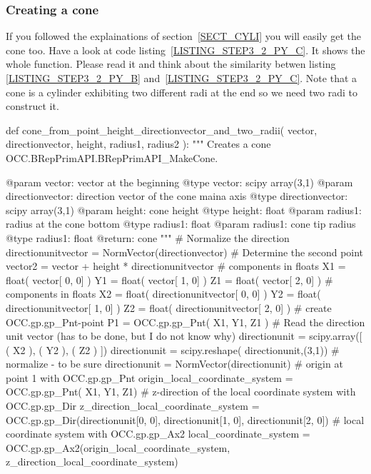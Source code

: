 \subsubsection{Creating a cone}
\label{SECT_CONE}
If you followed the explainations of section~\ref{SECT_CYLI} you will easily get the cone too.
Have a look at code listing~\ref{LISTING_STEP3_2_PY_C}.
It shows the whole function.
Please read it and think about the similarity betwen listing \ref{LISTING_STEP3_2_PY_B} and~\ref{LISTING_STEP3_2_PY_C}.
Note that a cone is a cylinder exhibiting two different radi at the end so we need two radi to construct it.
\begin{python}[moreemph={[4], 46, 48},caption={Step3\_2.py - Function defining a cone from a point, a direction vector, the height and two radi},label=LISTING_STEP3_2_PY_C]
def cone_from_point_height_directionvector_and_two_radii( vector, 
                                                          directionvector,
                                                          height,
                                                          radius1,
                                                          radius2 ):
    """
    Creates a cone OCC.BRepPrimAPI.BRepPrimAPI_MakeCone.
        
    @param vector: vector at the beginning
    @type  vector: scipy array(3,1)
    @param directionvector: direction vector of the cone maina axis 
    @type  directionvector: scipy array(3,1)
    @param height: cone height
    @type  height: float
    @param radius1: radius at the cone bottom
    @type  radius1: float
    @param radius1: cone tip radius
    @type  radius1: float
    @return: cone 
    """
    # Normalize the direction
    directionunitvector = NormVector(directionvector)
    # Determine the second point
    vector2 = vector + height * directionunitvector    
    # components in floats
    X1 = float( vector[ 0, 0] )
    Y1 = float( vector[ 1, 0] )
    Z1 = float( vector[ 2, 0] )
    # components in floats
    X2 = float( directionunitvector[ 0, 0] )
    Y2 = float( directionunitvector[ 1, 0] )
    Z2 = float( directionunitvector[ 2, 0] )
    # create OCC.gp.gp_Pnt-point
    P1 = OCC.gp.gp_Pnt( X1, Y1, Z1 )
    # Read the direction unit vector (has to be done, but I do not know why)
    directionunit = scipy.array([   ( X2 ),
                                    ( Y2 ),  
                                    ( Z2 ) ])
    directionunit = scipy.reshape( directionunit,(3,1))
    # normalize - to be sure 
    directionunit = NormVector(directionunit)
    # origin at point 1 with OCC.gp.gp_Pnt
    origin_local_coordinate_system = OCC.gp.gp_Pnt( X1, Y1, Z1)
    # z-direction of the local coordinate system with OCC.gp.gp_Dir
    z_direction_local_coordinate_system = OCC.gp.gp_Dir(directionunit[0, 0], 
                                                        directionunit[1, 0], 
                                                        directionunit[2, 0])
    # local coordinate system with OCC.gp.gp_Ax2
    local_coordinate_system = OCC.gp.gp_Ax2(origin_local_coordinate_system, 
                                            z_direction_local_coordinate_system)


\end{python}
